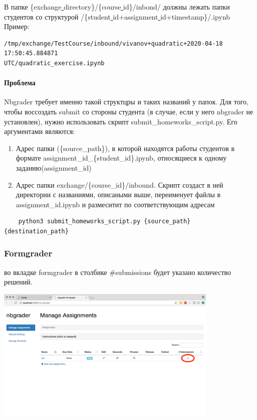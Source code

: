 \documentclass[a4paper,12pt]{article}
\begin{document}
В папке
 \{exchange\underline{ }directory\}/\{course\underline{ }id\}/inbond/ должны лежать папки студентов со структурой
/\{student\underline{ }id+assignment\underline{ }id+timestamp\}/.ipynb
\\Пример: 
\begin{verbatim}
/tmp/exchange/TestCourse/inbound/vivanov+quadratic+2020-04-18 17:50:45.884871
UTC/quadratic_exercise.ipynb
\end{verbatim}
\paragraph{Проблема}

Nbgrader требует именно такой структцры и таких названий у папок. Для того, чтобы воссоздать submit со стороны студента (в случае, если у него nbgrader не установлен), нужно использовать скрипт submit\_homeworks\_script.py. Его аргументами являются: 

\begin{enumerate}
    \item Адрес папки (\{source\_path\}), в которой находятся работы студентов в формате {assignment\_id}\_\{student\_id\}.ipynb, относящиеся к одному заданию(assignment\_id)
    \item Адрес папки exchange/\{course\_id\}/inbound. Скрипт создаст в ней директории с названиями, описаными выше, переименует файлы в {assignment\_id}.ipynb и размеситит по соответствующим адресам
\end{enumerate}

\begin{verbatim}
    python3 submit_homeworks_script.py {source_path} {destination_path}
\end{verbatim}
\subsubsection{Formgrader}

во вкладке formgrader в столбике \#submissions будет указано количество решений. 

\includegraphics[width=0.8\textwidth]{manage_assignments4}
\end{document}
